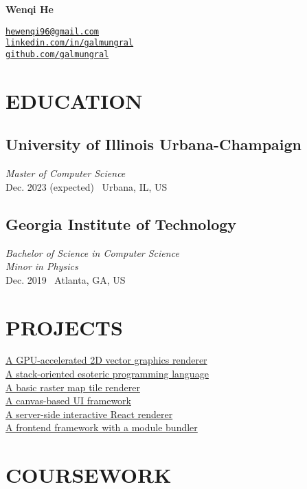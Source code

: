 \documentclass[11pt,twocolumn]{article}
\begin{document}
{\Huge\bf Wenqi He}

\vspace{10pt}
\href{mailto:hewenqi96@gmail.com}{\texttt{hewenqi96@gmail.com}}\\
\href{https://linkedin.com/in/galmungral}{\texttt{linkedin.com/in/galmungral}}\\
\href{https://github.com/galmungral}{\texttt{github.com/galmungral}}


\section*{\textnormal{EDUCATION}}

\subsection*{University of Illinois Urbana-Champaign}
\textit{Master of Computer Science}\\
Dec. 2023 (expected) \textbullet\ Urbana, IL, US

\subsection*{Georgia Institute of Technology}
\textit{Bachelor of Science in Computer Science}\\
\textit{Minor in Physics}\\
Dec. 2019 \textbullet\ Atlanta, GA, US

\section*{\textnormal{PROJECTS}}

\href{https://github.com/galmungral/polyrender}{A GPU-accelerated 2D vector graphics renderer}\\
\href{https://github.com/galmungral/hanbun-lang}{A stack-oriented esoteric programming language} \\
\href{https://github.com/galmungral/mercator}{A basic raster map tile renderer}\\
\href{https://github.com/galmungral/michelangelo}{A canvas-based UI framework}\\
\href{https://github.com/galmungral/react-teletype}{A server-side interactive React renderer} \\
\href{https://github.com/galmungral/replay}{A frontend framework with a module bundler}

\section*{\textnormal{COURSEWORK}}
\end{document}
